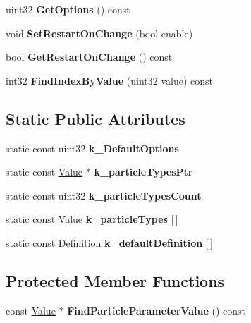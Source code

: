 \begin{DoxyCompactItemize}
\item 
\hypertarget{classParticleParameter_aa3b19b5082fc80cd5808a65f08b1eb07}{uint32 {\bfseries Get\-Options} () const }\label{classParticleParameter_aa3b19b5082fc80cd5808a65f08b1eb07}

\item 
\hypertarget{classParticleParameter_a05cfd47650aa0293d51b98ea6a0017e1}{void {\bfseries Set\-Restart\-On\-Change} (bool enable)}\label{classParticleParameter_a05cfd47650aa0293d51b98ea6a0017e1}

\item 
\hypertarget{classParticleParameter_a5f7f827051bf973f068b3024f3ca5183}{bool {\bfseries Get\-Restart\-On\-Change} () const }\label{classParticleParameter_a5f7f827051bf973f068b3024f3ca5183}

\item 
\hypertarget{classParticleParameter_a64183933049beec1f773e433c68f84eb}{int32 {\bfseries Find\-Index\-By\-Value} (uint32 value) const }\label{classParticleParameter_a64183933049beec1f773e433c68f84eb}

\end{DoxyCompactItemize}
\subsection*{Static Public Attributes}
\begin{DoxyCompactItemize}
\item 
static const uint32 {\bfseries k\-\_\-\-Default\-Options}
\item 
static const \hyperlink{structParticleParameter_1_1Value}{Value} $\ast$ {\bfseries k\-\_\-particle\-Types\-Ptr}
\item 
static const uint32 {\bfseries k\-\_\-particle\-Types\-Count}
\item 
static const \hyperlink{structParticleParameter_1_1Value}{Value} {\bfseries k\-\_\-particle\-Types} \mbox{[}$\,$\mbox{]}
\item 
static const \hyperlink{structParticleParameter_1_1Definition}{Definition} {\bfseries k\-\_\-default\-Definition} \mbox{[}$\,$\mbox{]}
\end{DoxyCompactItemize}
\subsection*{Protected Member Functions}
\begin{DoxyCompactItemize}
\item 
\hypertarget{classParticleParameter_a5366d1aa68281e5b7ff2460234cbe218}{const \hyperlink{structParticleParameter_1_1Value}{Value} $\ast$ {\bfseries Find\-Particle\-Parameter\-Value} () const }\label{classParticleParameter_a5366d1aa68281e5b7ff2460234cbe218}

\end{DoxyCompactItemize}


